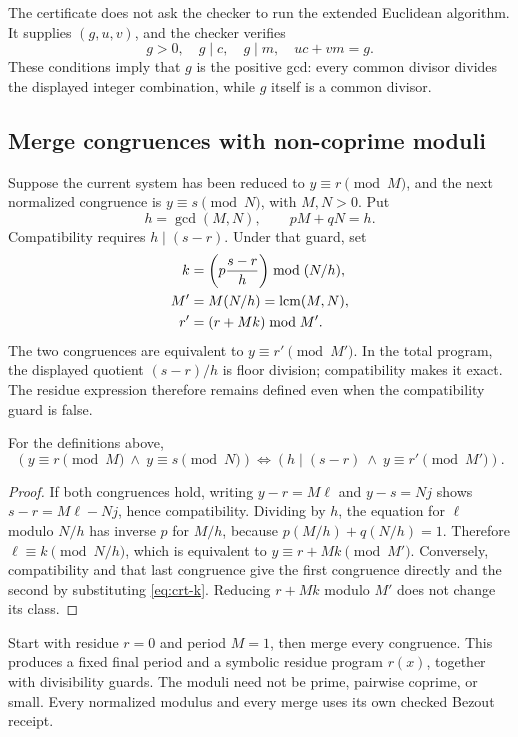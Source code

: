 The certificate does not ask the checker to run the extended Euclidean
algorithm. It supplies $(g,u,v)$, and the checker verifies
\[
 g>0,\quad g\mid c,\quad g\mid m,\quad uc+vm=g.
\]
These conditions imply that $g$ is the positive gcd: every common divisor divides
the displayed integer combination, while $g$ itself is a common divisor.

\subsection{Merge congruences with non-coprime moduli}
Suppose the current system has been reduced to $y\equiv r\pmod M$, and the next
normalized congruence is $y\equiv s\pmod N$, with $M,N>0$. Put
\[
 h=\gcd(M,N),\qquad pM+qN=h.
\]
Compatibility requires $h\mid(s-r)$. Under that guard, set
\begin{align}
 k&=\left(p\frac{s-r}{h}\right)\bmod(N/h),\label{eq:crt-k}\\
 M'&=M(N/h)=\operatorname{lcm}(M,N),\nonumber\\
 r'&=(r+Mk)\bmod M'.\label{eq:crt-r}
\end{align}
The two congruences are equivalent to $y\equiv r'\pmod{M'}$. In the total program, the displayed quotient $(s-r)/h$ is floor division; compatibility makes it exact. The residue expression therefore remains defined even when the compatibility guard is false.

\begin{lemma}
\label{lem:crt}
For the definitions above,
\[
 (y\equiv r\pmod M\ \land\ y\equiv s\pmod N)
 \Longleftrightarrow
 (h\mid(s-r)\ \land\ y\equiv r'\pmod{M'}).
\]
\end{lemma}
\begin{proof}
If both congruences hold, writing $y-r=M\ell$ and $y-s=Nj$ shows
$s-r=M\ell-Nj$, hence compatibility. Dividing by $h$, the equation for
$\ell$ modulo $N/h$ has inverse $p$ for $M/h$, because
$p(M/h)+q(N/h)=1$. Therefore $\ell\equiv k\pmod{N/h}$, which is equivalent
to $y\equiv r+Mk\pmod{M'}$. Conversely, compatibility and that last
congruence give the first congruence directly and the second by substituting
\eqref{eq:crt-k}. Reducing $r+Mk$ modulo $M'$ does not change its class.
\end{proof}

Start with residue $r=0$ and period $M=1$, then merge every congruence. This
produces a fixed final period and a symbolic residue program $r(x)$, together
with divisibility guards. The moduli need not be prime, pairwise coprime, or
small. Every normalized modulus and every merge uses its own checked Bezout
receipt.

